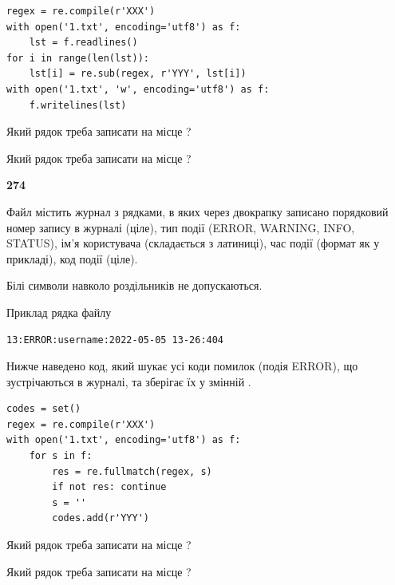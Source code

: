 \begin{verbatim}
regex = re.compile(r'XXX')
with open('1.txt', encoding='utf8') as f:
    lst = f.readlines()
for i in range(len(lst)):
    lst[i] = re.sub(regex, r'YYY', lst[i])
with open('1.txt', 'w', encoding='utf8') as f:
    f.writelines(lst)
\end{verbatim}







Який рядок треба записати на місце  ?\par
\vspace{5mm}


Який рядок треба записати на місце  ?\par


\newpage

{\begin {center}\textbf{ 274}\end {center}}\par
Файл  містить журнал з рядками, в яких через двокрапку записано поряд\-ко\-вий номер запису в журналі (ціле), тип події (ERROR, WARNING, INFO, STATUS), ім'я користувача (складається з латиниці), час події (фор\-мат як у прикладі), код події (ціле).

Білі символи навколо роздільників не допускаються.

Приклад рядка файлу



\begin{verbatim}
13:ERROR:username:2022-05-05 13-26:404
\end{verbatim}


Нижче наведено код, який шукає усі коди помилок (подія ERROR), що зустріча\-ють\-ся в журналі, та зберігає їх у змінній .



\begin{verbatim}
codes = set()
regex = re.compile(r'XXX')
with open('1.txt', encoding='utf8') as f:
    for s in f:
        res = re.fullmatch(regex, s)
        if not res: continue
        s = ''
        codes.add(r'YYY')
\end{verbatim}





Який рядок треба записати на місце  ?\par
\vspace{5mm}


Який рядок треба записати на місце  ?\par


